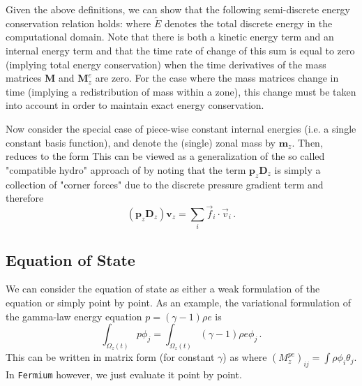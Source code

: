 Given the above definitions, we can show that the following semi-discrete energy
conservation relation holds:
where $\tilde E$ denotes the total discrete energy in the computational
domain. Note that there is both a kinetic energy term and an internal energy
term and that the time rate of change of this sum is equal to zero (implying
total energy conservation) when the time derivatives of the mass matrices
$\mathbf{M}$ and $\mathbf{M}^e_z$ are zero. For the case where the mass matrices change in time (implying a redistribution of mass within a zone), this change must be taken into account in order to maintain exact energy conservation.

Now consider the special case of piece-wise constant internal energies (i.e. a single constant basis function), and denote the (single) zonal mass by $\mathbf{m}_z$. Then,  reduces to the form
This can be viewed as a generalization of the so called "compatible hydro" approach of  \cite{CaramanaBurtonShashkov98} by noting that the term $\mathbf{p}_z \mathbf{D}_z$ is simply a collection of "corner forces" due to the discrete pressure gradient term and therefore
$$
  (\mathbf{p}_z \mathbf{D}_z) \mathbf{v}_z = \sum_i \vec f_i \cdot \vec v_i \,.
$$

\subsection{Equation of State}
We can consider the equation of state  as either a weak formulation of the equation or simply point by point. As an example, the variational formulation of the gamma-law energy equation $p=(\gamma-1)\rho e$ is
$$
  \int_{\Omega _z(t)} p \phi_j =
  \int_{\Omega _z(t)} (\gamma -1) \rho e \phi_j\,.
$$
This can be written in matrix form (for constant $\gamma$) as
where $\left( M^{pe}_z\right)_{ij} = \int \rho \phi_i \theta_j$.
In \texttt{Fermium} however, we just evaluate it point by point.

